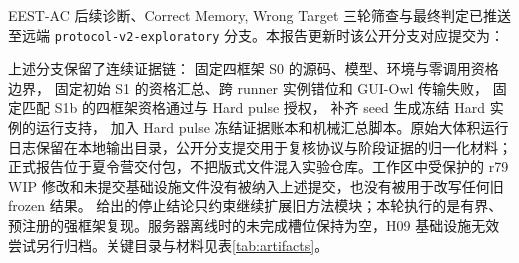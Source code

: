 \documentclass[12pt,a4paper]{ctexart}
\begin{document}
EEST-AC 后续诊断、Correct Memory, Wrong Target 三轮筛查与最终判定已推送至远端 \texttt{protocol-v2-exploratory} 分支。本报告更新时该公开分支对应提交为：

\begin{center}
\end{center}

上述分支保留了连续证据链： 固定四框架 S0 的源码、模型、环境与零调用资格边界， 固定初始 S1 的资格汇总、跨 runner 实例错位和 GUI-Owl 传输失败， 固定匹配 S1b 的四框架资格通过与 Hard pulse 授权， 补齐 seed 生成冻结 Hard 实例的运行支持， 加入 Hard pulse 冻结证据账本和机械汇总脚本。原始大体积运行日志保留在本地输出目录，公开分支提交用于复核协议与阶段证据的归一化材料；正式报告位于夏令营交付包，不把版式文件混入实验仓库。工作区中受保护的 r79 WIP 修改和未提交基础设施文件没有被纳入上述提交，也没有被用于改写任何旧 frozen 结果。 给出的停止结论只约束继续扩展旧方法模块；本轮执行的是有界、预注册的强框架复现。服务器离线时的未完成槽位保持为空，H09 基础设施无效尝试另行归档。关键目录与材料见表\ref{tab:artifacts}。
\end{document}
